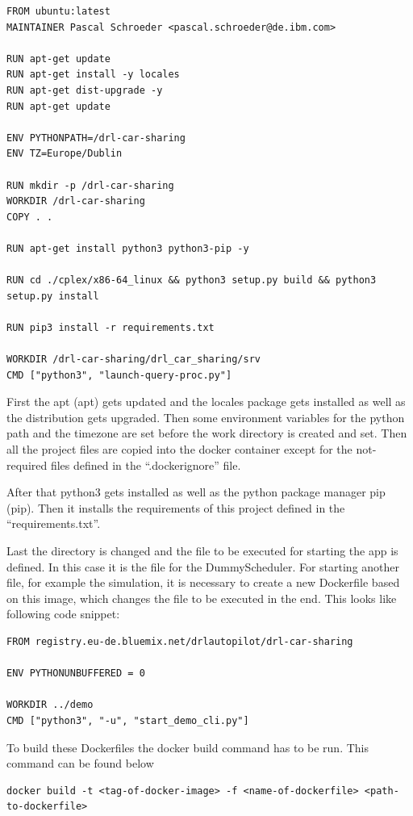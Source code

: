 \begin{lstlisting}
FROM ubuntu:latest
MAINTAINER Pascal Schroeder <pascal.schroeder@de.ibm.com>

RUN apt-get update 
RUN apt-get install -y locales
RUN apt-get dist-upgrade -y
RUN apt-get update

ENV PYTHONPATH=/drl-car-sharing
ENV TZ=Europe/Dublin

RUN mkdir -p /drl-car-sharing
WORKDIR /drl-car-sharing
COPY . .

RUN apt-get install python3 python3-pip -y

RUN cd ./cplex/x86-64_linux && python3 setup.py build && python3 setup.py install

RUN pip3 install -r requirements.txt

WORKDIR /drl-car-sharing/drl_car_sharing/srv
CMD ["python3", "launch-query-proc.py"]
\end{lstlisting}

First the \acs{apt} (\acl{apt}) gets updated and the locales package gets installed as well as the distribution gets upgraded. Then some environment variables for the python path and the timezone are set before the work directory is created and set. Then all the project files are copied into the docker container except for the not-required files defined in the ``.dockerignore'' file.

After that python3 gets installed as well as the python package manager \acs{pip} (\acl{pip}).  Then it installs the requirements of this project defined in the ``requirements.txt''. 

Last the directory is changed and the file to be executed for starting the app is defined. In this case it is the file for the DummyScheduler. For starting another file, for example the simulation, it is necessary to create a new Dockerfile based on this image, which changes the file to be executed in the end. This looks like following code snippet:

\begin{lstlisting}
FROM registry.eu-de.bluemix.net/drlautopilot/drl-car-sharing

ENV PYTHONUNBUFFERED = 0

WORKDIR ../demo
CMD ["python3", "-u", "start_demo_cli.py"]
\end{lstlisting}

To build these Dockerfiles the docker build command has to be run. This command can be found below

\begin{lstlisting}
docker build -t <tag-of-docker-image> -f <name-of-dockerfile> <path-to-dockerfile>
\end{lstlisting}

